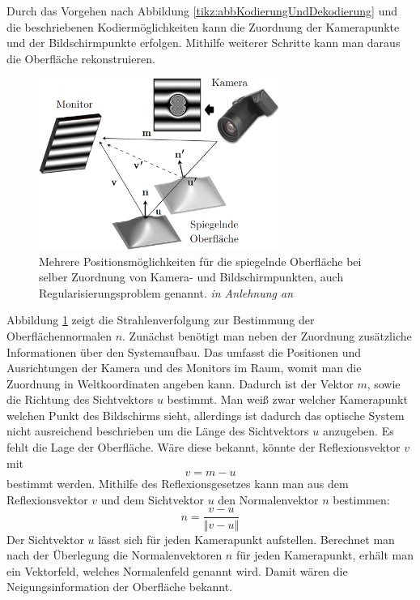 Durch das Vorgehen nach Abbildung \ref{tikz:abbKodierungUndDekodierung} und die beschriebenen Kodiermöglichkeiten kann die Zuordnung der Kamerapunkte und der Bildschirmpunkte erfolgen.
Mithilfe weiterer Schritte kann man daraus die Oberfläche rekonstruieren.
%
\begin{figure}[H]
	\centering
	\includegraphics[width=0.7\textwidth]{02_grundlagenDerDeflektometrie/rekonstruktion/rekonstruktionUndRegularisierungsproblem/figures/regularisierungsproblem}
	\caption[Regularisierungsproblem]{Mehrere Positionsmöglichkeiten für die spiegelnde Oberfläche bei selber Zuordnung von Kamera- und Bildschirmpunkten, auch Regularisierungsproblem genannt. \textit{in Anlehnung an} \cite{stereoDeflektometrie}}
	\label{img:regularisierungsproblem}
\end{figure}
%
\noindent
Abbildung \ref{img:regularisierungsproblem} zeigt die Strahlenverfolgung zur Bestimmung der Oberflächennormalen $n$.
Zunächst benötigt man neben der Zuordnung zusätzliche Informationen über den Systemaufbau.
Das umfasst die Positionen und Ausrichtungen der Kamera und des Monitors im Raum, womit man die Zuordnung in Weltkoordinaten angeben kann.
Dadurch ist der Vektor $m$, sowie die Richtung des Sichtvektors $u$ bestimmt.
Man weiß zwar welcher Kamerapunkt welchen Punkt des Bildschirms sieht, allerdings ist dadurch das optische System nicht ausreichend beschrieben um die Länge des Sichtvektors $u$ anzugeben.
Es fehlt die Lage der Oberfläche.
Wäre diese bekannt, könnte der Reflexionsvektor $v$ mit 
\begin{equation*}
	v = m - u
\end{equation*}
bestimmt werden.
Mithilfe des Reflexionsgesetzes kann man aus dem Reflexionsvektor $v$ und dem Sichtvektor $u$ den Normalenvektor $n$ bestimmen:
%
\begin{equation}
	n = \dfrac{v - u}{\left\Vert v - u \right\Vert}
\end{equation}
%
Der Sichtvektor $u$ lässt sich für jeden Kamerapunkt aufstellen.
Berechnet man nach der Überlegung die Normalenvektoren $n$ für jeden Kamerapunkt, erhält man ein Vektorfeld, welches Normalenfeld genannt wird.
Damit wären die Neigungsinformation der Oberfläche bekannt.

